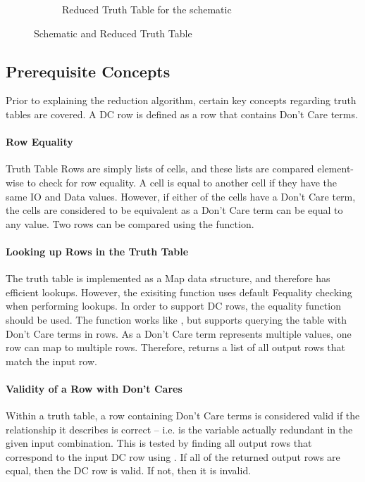 \begin{figure}
\begin{subfigure}[b]{0.45\textwidth}
         \caption{Reduced Truth Table for the schematic}
         \label{fig:mux4table}
     \end{subfigure}
        \caption{Schematic and Reduced Truth Table}
        \label{fig:mux4}
\end{figure}

\subsection{Prerequisite Concepts}
Prior to explaining the reduction algorithm, certain key concepts regarding truth tables are covered. A DC row is defined as a row that contains Don't Care terms.
\paragraph{Row Equality} 
Truth Table Rows are simply lists of cells, and these lists are compared element-wise to check for row equality. A cell is equal to another cell if they have the same IO and Data values. However, if either of the cells have a Don't Care term, the cells are considered to be equivalent as a Don't Care term can be equal to any value. Two rows can be compared using the  function.

\paragraph{Looking up Rows in the Truth Table}
The truth table is implemented as a Map data structure, and therefore has efficient lookups. However, the exisiting  function uses default F\fsharp equality checking when performing lookups. In order to support DC rows, the equality function  should be used. The function  works like , but supports querying the table with Don't Care terms in rows. As a Don't Care term represents multiple values, one row can map to multiple rows. Therefore,  returns a list of all output rows that match the input row.

\paragraph{Validity of a Row with Don't Cares}
Within a truth table, a row containing Don't Care terms is considered valid if the relationship it describes is correct -- i.e. is the variable actually redundant in the given input combination. This is tested by finding all output rows that correspond to the input DC row using . If all of the returned output rows are equal, then the DC row is valid. If not, then it is invalid.


